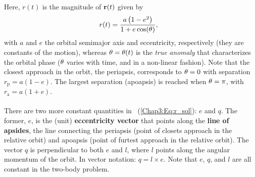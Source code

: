 \documentclass[main.tex]{subfiles}
\begin{document}
\begin{tcolorbox}[sharp corners, colback=blue!30, colframe=blue!80!blue, title=Box \refstepcounter{educhap3}\label{boxchap3:dynIII}\ref{boxchap3:dynIII} -- Orbital Dynamics III]
{Here, $r(t)$ is the magnitude of ${\mathbf{r}}(t)$ given by
\begin{align}
r(t) = \frac{a \left(1-e^2\right)}{1 + e \cos (\theta)},
\end{align}
with $a$ and $e$ the orbital semimajor axis and eccentricity, respectively (they are constants of the motion), whereas $\theta=\theta(t)$ is the {\it true anomaly} that characterizes the orbital phase ($\theta$ varies with time, and in a non-linear fashion). Note that the closest approach in the orbit, the periapsis, corresponds to $\theta=0$ with separation $r_\mathrm{p} = a(1-e)$. The largest separation (apoapsis) is reached when $\theta=\pi$, with $r_\mathrm{a} = a(1+e)$. \\ \\
There are two more constant quantities in \Eq~(\ref{Chap3:Eq:r_sol}): $\unit{e}$ and $\unit{q}$. The former, $\unit{e}$, is the (unit) {\bf eccentricity vector} that points along the {\bf line of apsides}, the line connecting the periapsis (point of closets approach in the relative orbit) and apoapsis (point of furtest approach in the relative orbit). The vector $\unit{q}$ is perpendicular to both $\unit{e}$ and $\unit{l}$, where $\unit{l}$ points along the angular momentum of the orbit. In vector notation: $\unit{q} = \unit{l} \times \unit{e}$. Note that $\unit{e}$, $\unit{q}$, and $\unit{l}$ are all constant in the two-body problem. }
\end{tcolorbox}
\end{document}
